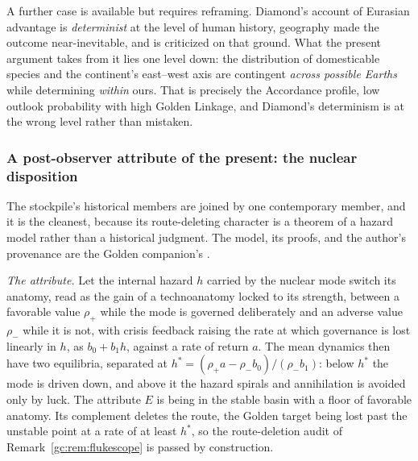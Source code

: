 A further case is available but requires reframing. Diamond's account of
Eurasian advantage \cite{Diamond97} is \emph{determinist} at the level
of human history, geography made the outcome near-inevitable, and
is criticized on that ground. What the present argument takes from it
lies one level down: the distribution of domesticable species and the
continent's east--west axis are contingent \emph{across possible
Earths} while determining \emph{within} ours. That is precisely the
Accordance profile, low outlook probability with high Golden Linkage,
and Diamond's determinism is at the wrong level rather than mistaken.

\subsubsection{A post-observer attribute of the present: the nuclear disposition}
\label{gc:subsub:nuclear}

The stockpile's historical members are joined by one contemporary member,
and it is the cleanest, because its route-deleting character is a theorem
of a hazard model rather than a historical judgment. The model, its
proofs, and the author's provenance are the Golden companion's
\cite{GoldenReasoning}.

\emph{The attribute.} Let the internal hazard $h$ carried by the nuclear
mode switch its anatomy, read as the gain of a technoanatomy locked to its strength, between a favorable value $\rho_+$ while the mode
is governed deliberately and an adverse value $\rho_-$ while it is not,
with crisis feedback raising the rate at which governance is lost
linearly in $h$, as $b_0+b_1h$, against a rate of return $a$. The mean
dynamics then have two equilibria, separated at
$h^\ast=(\rho_+a-\rho_-b_0)/(\rho_-b_1)$: below $h^\ast$ the mode is driven
down, and above it the hazard spirals and annihilation is avoided only by
luck. The attribute $E$ is being in the stable basin with a floor of
favorable anatomy. Its complement deletes the route, the Golden target
being lost past the unstable point at a rate of at least $h^\ast$, so the
route-deletion audit of Remark~\ref{gc:rem:flukescope} is passed by
construction.


